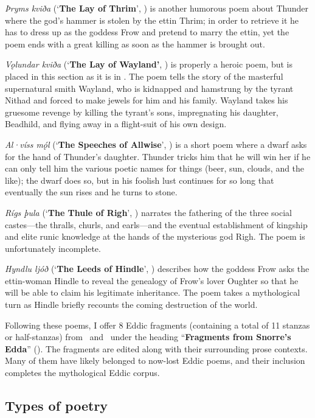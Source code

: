 \emph{Þryms kviða} (‘\textbf{The Lay of Thrim}’, ) is another humorous poem about Thunder where the god’s hammer is stolen by the ettin Thrim; in order to retrieve it he has to dress up as the goddess Frow and pretend to marry the ettin, yet the poem ends with a great killing as soon as the hammer is brought out.

\emph{Vǫlundar kviða} (‘\textbf{The Lay of Wayland’}, ) is properly a heroic poem, but is placed in this section as it is in \Regius.  The poem tells the story of the masterful supernatural smith Wayland, who is kidnapped and hamstrung by the tyrant Nithad and forced to make jewels for him and his family.  Wayland takes his gruesome revenge by killing the tyrant’s sons, impregnating his daughter, Beadhild, and flying away in a flight-suit of his own design.

\emph{Al·víss mǫ́l} (‘\textbf{The Speeches of Allwise}’, ) is a short poem where a dwarf asks for the hand of Thunder’s daughter.  Thunder tricks him that he will win her if he can only tell him the various poetic names for things (beer, sun, clouds, and the like); the dwarf does so, but in his foolish lust continues for so long that eventually the sun rises and he turns to stone.

\emph{Rígs þula} (‘\textbf{The Thule of Righ}’, ) narrates the fathering of the three social castes---the thralls, churls, and earls---and the eventual establishment of kingship and elite runic knowledge at the hands of the mysterious god Righ.  The poem is unfortunately incomplete.

\emph{Hyndlu ljóð} (‘\textbf{The Leeds of Hindle}’, ) describes how the goddess Frow asks the ettin-woman Hindle to reveal the genealogy of Frow’s lover Oughter so that he will be able to claim his legitimate inheritance.  The poem takes a mythological turn as Hindle briefly recounts the coming destruction of the world.

Following these poems, I offer 8 Eddic fragments (containing a total of 11 stanzas or half-stanzas) from \Gylfaginning\ and \Skaldskaparmal\ under the heading “\textbf{Fragments from Snorre’s Edda}” ().  The fragments are edited along with their surrounding prose contexts.  Many of them have likely belonged to now-lost Eddic poems, and their inclusion completes the mythological Eddic corpus.

\subsection{Types of poetry}

